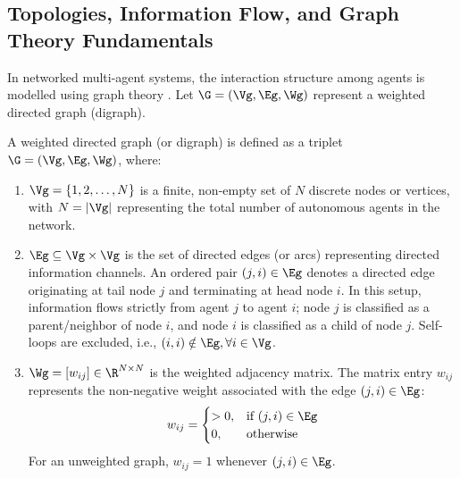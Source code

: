 \subsection{Topologies, Information Flow, and Graph Theory Fundamentals}
In networked multi-agent systems, the interaction structure among agents is modelled using graph theory \cite{godsil2001algebraic, mesbahi2010graph}. Let $\G = (\Vg, \Eg, \Wg)$ represent a weighted directed graph (digraph).
\begin{definition}\label{def:weighted_digraph}
A weighted directed graph (or digraph) is defined as a triplet $\G = (\Vg, \Eg, \Wg)$, where:
\begin{enumerate}
    \item $\Vg = \{1, 2, \dots, N\}$ is a finite, non-empty set of $N$ discrete nodes or vertices, with $N = |\Vg|$ representing the total number of autonomous agents in the network.
    \item $\Eg \subseteq \Vg \times \Vg$ is the set of directed edges (or arcs) representing directed information channels. An ordered pair $(j, i) \in \Eg$ denotes a directed edge originating at tail node $j$ and terminating at head node $i$. In this setup, information flows strictly from agent $j$ to agent $i$; node $j$ is classified as a parent/neighbor of node $i$, and node $i$ is classified as a child of node $j$. Self-loops are excluded, i.e., $(i, i) \notin \Eg, \forall i \in \Vg$.
    \item $\Wg = [w_{ij}] \in \R^{N \times N}$ is the weighted adjacency matrix. The matrix entry $w_{ij}$ represents the non-negative weight associated with the edge $(j, i) \in \Eg$:
    \begin{equation}\label{eq:adj_matrix_def}
        w_{ij} = \begin{cases}
            > 0, & \text{if } (j, i) \in \Eg \\
            0, & \text{otherwise}
        \end{cases}
    \end{equation}
    For an unweighted graph, $w_{ij} = 1$ whenever $(j, i) \in \Eg$.
\end{enumerate}
\end{definition}

